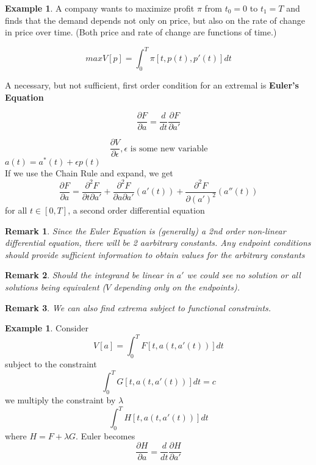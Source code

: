 \documentclass[12pt]{article}
\theoremstyle{plain}
\newtheorem*{remark}{Remark}
\theoremstyle{definition}
\newtheorem{example}[theorem]{Example}
\begin{document}
\begin{example}
	A company wants to maximize profit $\pi$ from $t_0 = 0$ to $t_1 = T$ and finds that the demand depends not only on price, but also on the rate of change in price over time. (Both price and rate of change are functions of time.)

	$$max V[p]=\int^T_0 \pi[t, p(t), p'(t)]dt$$
\end{example}

A necessary, but not sufficient, first order condition for an extremal is \textbf{Euler's Equation}

$$\frac{\partial F}{\partial a} = \frac{d}{dt} \frac{\partial F}{\partial a'}$$

$$\frac{\partial V}{\partial \epsilon}, \epsilon \text{ is some new variable}$$
$a(t) = a^* (t) + \epsilon p(t)$\\

If we use the Chain Rule and expand, we get
$$\frac{\partial F}{\partial a} = \frac{\partial^2 F}{\partial t \partial a'} + \frac{\partial^2 F}{\partial a \partial a'}(a'(t)) + \frac{\partial^2 F}{\partial (a')^2}(a''(t))$$
for all $t\in [0,T]$, a second order differential equation

\begin{remark}
	Since the Euler Equation is (generally) a 2nd order non-linear differential equation, there will be 2 aarbitrary constants. Any endpoint conditions should provide sufficient information to obtain values for the arbitrary constants
\end{remark}

\begin{remark}
	Should the integrand be linear in $a'$ we could see no solution or all solutions being equivalent ($V$ depending only on the endpoints).
\end{remark}

\begin{remark}
	We can also find extrema subject to functional constraints.
\end{remark}

\begin{example}
	Consider
	$$V[a]=\int^T_0 F[t, a(t, a'(t))]dt$$
	subject to the constraint
	$$\int^T_0 G[t, a(t, a'(t))]dt = c$$
	we multiply the constraint by $\lambda$
	$$\int^T_0 H[t, a(t, a'(t))]dt$$
	where $H = F + \lambda G$. Euler becomes
	$$\frac{\partial H}{\partial a} = \frac{d}{dt} \frac{\partial H}{\partial a'}$$
\end{example}
\end{document}
